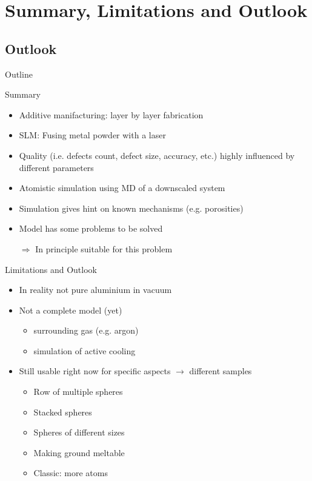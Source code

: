 \section[Summary]{Summary, Limitations and Outlook}
\subsection*{Outlook}
\begin{frame}{Outline}
	\tableofcontents[currentsection]
\end{frame}


\begin{frame}{Summary}
	\begin{itemize}[<+->]
		\item Additive manifacturing: layer by layer fabrication
		\item SLM: Fusing metal powder with a laser
		\item Quality (i.e. defects count, defect size, accuracy, etc.) highly influenced by different parameters
		\item Atomistic simulation using MD of a downscaled system
		\item Simulation gives hint on known mechanisms (e.g. porosities)
		\item Model has some problems to be solved
		\vspace{1cm}
		\item[$\Rightarrow$] In principle suitable for this problem
	\end{itemize}
\end{frame}


\begin{frame}{Limitations and Outlook}
	\begin{itemize}[<+->]
		\item In reality not pure aluminium in vacuum
		\item Not a complete model (yet)
		\begin{itemize}
			\item surrounding gas (e.g. argon)
			\item simulation of active cooling
		\end{itemize}
		\item Still usable right now for specific aspects $\rightarrow$ different samples
		\begin{itemize}
			\item Row of multiple spheres
			\item Stacked spheres
			\item Spheres of different sizes
			\item Making ground meltable
			\item Classic: more atoms
		\end{itemize}
	\end{itemize}
\end{frame}


